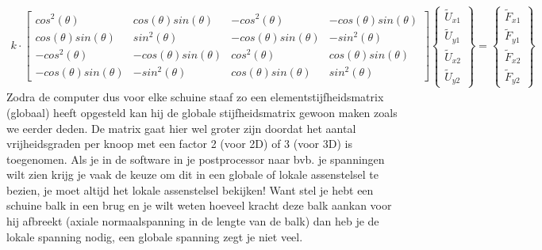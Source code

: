 \documentclass[a4paper,11pt,twoside]{report}
\begin{document}
\begin{align*}
    k \cdot
    \begin{bmatrix}
        cos^2(\theta)           & cos(\theta)sin(\theta)  & -cos^2(\theta)          & -cos(\theta)sin(\theta) \\
        cos(\theta)sin(\theta)  & sin^2(\theta)           & -cos(\theta)sin(\theta) & -sin^2(\theta)          \\
        -cos^2(\theta)          & -cos(\theta)sin(\theta) & cos^2(\theta)           & cos(\theta)sin(\theta)  \\
        -cos(\theta)sin(\theta) & -sin^2(\theta)          & cos(\theta)sin(\theta)  & sin^2(\theta)
    \end{bmatrix}
    \begin{Bmatrix}
        \tilde{U}_{x1} \\
        \tilde{U}_{y1} \\
        \tilde{U}_{x2} \\
        \tilde{U}_{y2}
    \end{Bmatrix}
    =
    \begin{Bmatrix}
        \tilde{F}_{x1} \\
        \tilde{F}_{y1} \\
        \tilde{F}_{x2} \\
        \tilde{F}_{y2}
    \end{Bmatrix}
\end{align*}
Zodra de computer dus voor elke schuine staaf zo een elementstijfheidsmatrix (globaal) heeft
opgesteld kan hij de globale stijfheidsmatrix gewoon maken zoals we eerder deden. De matrix gaat
hier wel groter zijn doordat het aantal vrijheidsgraden per knoop met een factor 2 (voor 2D) of 3
(voor 3D) is toegenomen. Als je in de software in je postprocessor naar bvb. je spanningen wilt zien
krijg je vaak de keuze om dit in een globale of lokale assenstelsel te bezien, je moet altijd het
lokale assenstelsel bekijken! Want stel je hebt een schuine balk in een brug en je wilt weten
hoeveel kracht deze balk aankan voor hij afbreekt (axiale normaalspanning in de lengte van de balk)
dan heb je de lokale spanning nodig, een globale spanning zegt je niet veel.
\newpage
\end{document}
